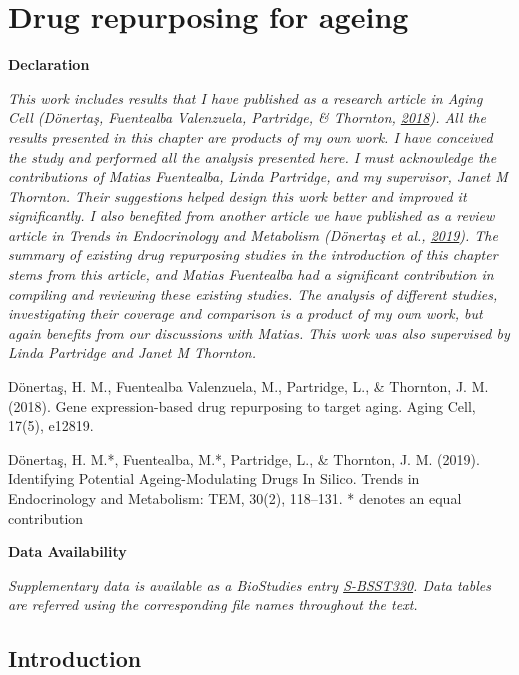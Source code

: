 \documentclass[12pt,twoside]{unicam}
\begin{document}
\hypertarget{drugChapter}{%
\chapter{Drug repurposing for ageing}\label{drugChapter}}

\small

\textbf{Declaration}

\emph{This work includes results that I have published as a research article in Aging Cell (Dönertaş, Fuentealba Valenzuela, Partridge, \& Thornton, \protect\hyperlink{ref-Donertas2018}{2018}). All the results presented in this chapter are products of my own work. I have conceived the study and performed all the analysis presented here. I must acknowledge the contributions of Matias Fuentealba, Linda Partridge, and my supervisor, Janet M Thornton. Their suggestions helped design this work better and improved it significantly. I also benefited from another article we have published as a review article in Trends in Endocrinology and Metabolism (Dönertaş et al., \protect\hyperlink{ref-Donertas2019}{2019}). The summary of existing drug repurposing studies in the introduction of this chapter stems from this article, and Matias Fuentealba had a significant contribution in compiling and reviewing these existing studies. The analysis of different studies, investigating their coverage and comparison is a product of my own work, but again benefits from our discussions with Matias. This work was also supervised by Linda Partridge and Janet M Thornton.}

Dönertaş, H. M., Fuentealba Valenzuela, M., Partridge, L., \& Thornton, J. M. (2018). Gene expression-based drug repurposing to target aging. Aging Cell, 17(5), e12819.

Dönertaş, H. M.*, Fuentealba, M.*, Partridge, L., \& Thornton, J. M. (2019). Identifying Potential Ageing-Modulating Drugs In Silico. Trends in Endocrinology and Metabolism: TEM, 30(2), 118--131.
* denotes an equal contribution

\textbf{Data Availability}

\emph{Supplementary data is available as a BioStudies entry \href{https://www.ebi.ac.uk/biostudies/studies/S-BSST330}{S-BSST330}. Data tables are referred using the corresponding file names throughout the text.}
\normalsize

\newpage

\hypertarget{introduction-3}{%
\section{Introduction}\label{introduction-3}}
\end{document}
